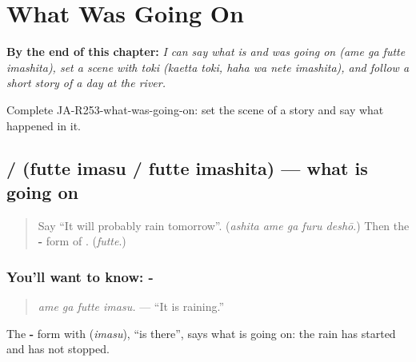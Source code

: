
\chapter{What Was Going On}
\label{ch:ja-what-was-going-on}

\begin{chapteropening}
\textbf{By the end of this chapter:} \emph{I can say what is and was going on (ame ga futte imashita), set a scene with toki (kaetta toki, haha wa nete imashita), and follow a short story of a day at the river.}

Complete JA-R253-what-was-going-on: set the scene of a story and say what happened in it.
\end{chapteropening}

\section[\texorpdfstring{\ja{ふっています} … (futte imasu …)}{ふっています … (futte imasu …)}]{ /  (futte imasu / futte imashita) — what is going on}

\label{lesson:JA-C253-futte-imasu}



\begin{quote}
Say \textquotedblleft{}It will probably rain tomorrow\textquotedblright{}. (\emph{ashita ame ga furu deshō}.) Then the \textbf{-} form of \textbf{}. (\emph{futte}.)
\end{quote}

\subsection*{You'll want to know: -}
\begin{quote}
\textbf{ }
\end{quote}

\begin{quote}
\emph{ame ga futte imasu.} — \textquotedblleft{}It is raining.\textquotedblright{}
\end{quote}

The \textbf{-} form with \textbf{} (\emph{imasu}), \textquotedblleft{}is there\textquotedblright{}, says what is going on: the rain has started and has not stopped.

